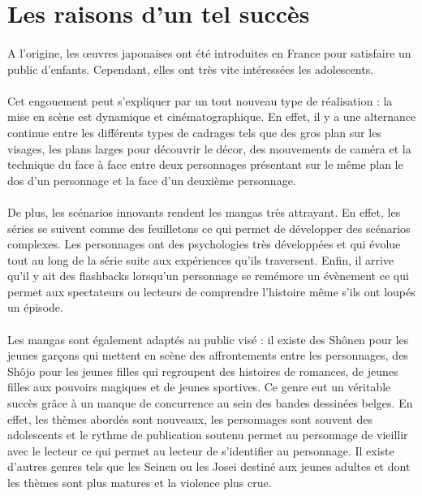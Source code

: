 \section{Les raisons d'un tel succès}
\paragraph{}
A l’origine, les œuvres japonaises ont été introduites en France pour satisfaire un public d’enfants. Cependant, elles ont très vite intéressées les adolescents. 
\paragraph{}
Cet engouement peut s’expliquer par un tout nouveau type de réalisation : la mise en scène est dynamique et cinématographique. En effet, il y a une alternance continue entre les différents types de cadrages tels que des gros plan sur les visages, les plans larges pour découvrir le décor, des mouvements de caméra et la technique du face à face entre deux personnages présentant sur le même plan le dos d’un personnage et la face d’un deuxième personnage. 
\paragraph{}
De plus, les scénarios innovants rendent les mangas très attrayant. En effet, les séries se suivent comme des feuilletons ce qui permet de développer des scénarios complexes. Les personnages ont des psychologies très développées et qui évolue tout au long de la série suite aux expériences qu’ils traversent. Enfin, il arrive qu’il y ait des flashbacks lorsqu’un personnage se remémore un évènement ce qui permet aux spectateurs ou lecteurs de comprendre l’histoire même s’ils ont loupés un épisode. 
\paragraph{}
Les mangas sont également adaptés au public visé : il existe des Shônen pour les jeunes garçons qui mettent en scène des affrontements entre les personnages, des Shôjo pour les jeunes filles qui regroupent des histoires de romances, de jeunes filles aux pouvoirs magiques et de jeunes sportives. Ce genre eut un véritable succès grâce à un manque de concurrence au sein des bandes dessinées belges. En effet, les thèmes abordés sont nouveaux, les personnages sont souvent des adolescents et le rythme de publication soutenu permet au personnage de vieillir avec le lecteur ce qui permet au lecteur de s’identifier au personnage. Il existe d’autres genres tels que les Seinen ou les Josei destiné aux jeunes adultes et dont les thèmes sont plus matures et la violence plus crue.
